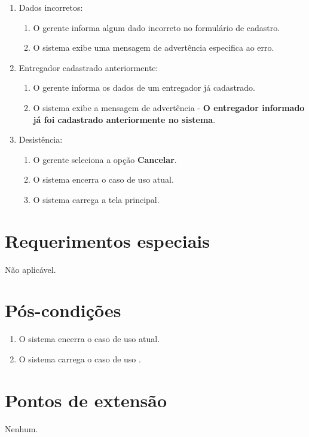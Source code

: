 \begin{enumerate}
	\item Dados incorretos:
	\begin{enumerate}
		\item O gerente informa algum dado incorreto no formulário de cadastro. 
		\item O sistema exibe uma mensagem de advertência especifica ao erro.
	\end{enumerate}
	\item Entregador cadastrado anteriormente:
	\begin{enumerate}
		\item O gerente informa os dados de um entregador já cadastrado. 
		\item O sistema exibe a mensagem de advertência - \textbf{O entregador informado já foi cadastrado anteriormente no sistema}.
	\end{enumerate}	
	\item Desistência:
	\begin{enumerate}
		\item O gerente seleciona a opção \textbf{Cancelar}.
		\item O sistema encerra o caso de uso atual.
		\item O sistema carrega a tela principal.
	\end{enumerate}
\end{enumerate}

\section{Requerimentos especiais}

Não aplicável.

\section{Pós-condições}

\begin{enumerate}
	\item O sistema encerra o caso de uso atual.
	\item O sistema carrega o caso de uso .
\end{enumerate}

\section{Pontos de extensão}

Nenhum.
